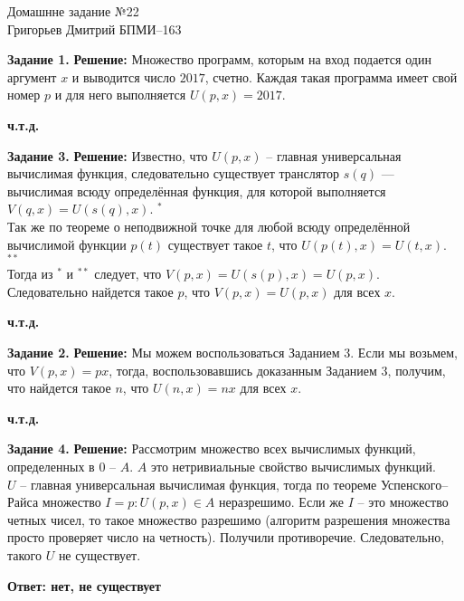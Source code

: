 \documentclass[12pt,a4paper]{scrartcl}
\begin{document}
	\begin{center}	
		Домашнне задание №22 \\
		Григорьев Дмитрий БПМИ--163
	\end{center}
	\textbf{Задание 1.}
	\newline
	\textbf{Решение:}
	\newline
	\indent
	Множество программ, которым на вход подается один аргумент $x$ и выводится число $2017$, счетно. Каждая такая программа имеет свой номер $p$ и для него выполняется $U(p, x) = 2017$.
	\begin{flushright}	
		\textbf{ч.т.д.}
	\end{flushright}
	\textbf{Задание 3.} 
	\newline
	\textbf{Решение:} 
	\newline
	\indent
	Известно, что $U(p, x)$ -- главная универсальная вычислимая функция, следовательно существует транслятор $s(q)$ —
	вычислимая всюду определённая функция, для которой выполняется 
	$V(q, x) = U(s(q), x)$. $^{*}$\\
	Так же по теореме о неподвижной точке для любой всюду определённой вычислимой функции $p(t)$ существует такое
	$t$, что $U(p(t), x) = U(t, x)$.  $^{**}$\\
	Тогда из $^{*}$ и $^{**}$ следует, что $V(p, x) = U(s(p), x) = U(p, x)$. Следовательно найдется такое $p$, что $V(p, x) = U(p, x)$ для всех $x$.
	\begin{flushright}
		\textbf{ч.т.д.}
	\end{flushright}
	\noindent
	\textbf{Задание 2.} 
	\newline
	\textbf{Решение:}
	\newline
	\indent
	Мы можем воспользоваться Заданием 3. Если мы возьмем, что $V(p, x) = px$, тогда, воспользовавшись доказанным Заданием 3, получим, что найдется такое $n$, что $U(n, x) = nx$ для всех $x$.
	\begin{flushright}	
		\textbf{ч.т.д.}
	\end{flushright}
	\textbf{Задание 4.}
	\newline
	\textbf{Решение:}
	\newline
	\indent
	Рассмотрим множество всех вычислимых функций, определенных в $0$ -- $A$. $A$ это нетривиальные свойство вычислимых функций. \\
	$U$ -- главная универсальная вычислимая функция, тогда по теореме
	Успенского--Райса множество $I = {p : U(p, x) \in A}$ неразрешимо. Если же $I$ -- это множество четных чисел, то такое множество разрешимо (алгоритм
	разрешения множества просто проверяет число на четность). Получили противоречие. Следовательно, такого $U$ не существует.
	\begin{flushright}
		\textbf{Ответ: нет, не существует}
	\end{flushright}
	
	\noindent
\end{document}
